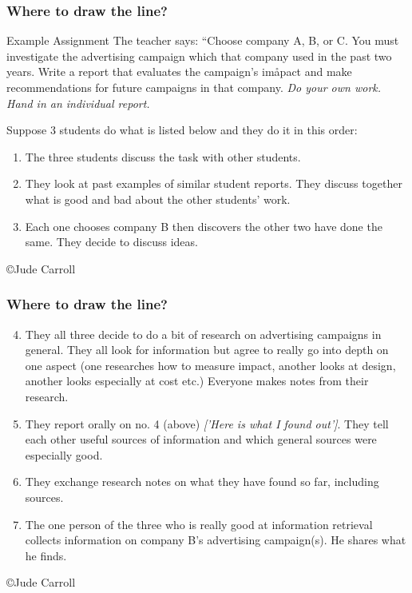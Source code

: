 \documentclass[10pt]{beamer}
\begin{document}
\begin{frame}[t]
\frametitle{Where to draw the line?}
\begin{block}{Example Assignment}
The teacher says: ``Choose company A, B, or C. You must investigate the advertising campaign which that company used in the past two years. Write a report that evaluates the campaign's imåpact and make recommendations for future campaigns in that company. \emph{Do your own work. Hand in an individual report.}
\end{block}

Suppose 3 students do what is listed below and they do it in this order:
\begin{enumerate}
\item The three students discuss the task with other students.
\item They look at past examples of similar student reports. They discuss together what is good and bad about the other students' work.
\item Each one chooses company B then discovers the other two have done the same. They decide to discuss ideas.
\end{enumerate}
\begin{scriptsize}
\copyright Jude Carroll
\end{scriptsize}
\end{frame}
\begin{frame}[t]
\frametitle{Where to draw the line?}
\begin{enumerate}
\setcounter{enumi}{3}
\item They all three decide to do a bit of research on advertising campaigns in general. They all look for information but agree to really go into depth on one aspect (one researches how to measure impact, another looks at design, another looks especially at cost etc.) Everyone makes notes from their research.
\item They report orally on no. 4 (above) \emph{['Here is what I found out']}. They tell each other useful sources of information and which general sources were especially good.
\item They exchange research notes on what they have found so far, including sources.
\item The one person of the three who is really good at information retrieval collects information on company B's advertising campaign(s). He shares what he finds.
\end{enumerate}
\begin{scriptsize}
\copyright Jude Carroll
\end{scriptsize}
\end{frame}
\end{document}

